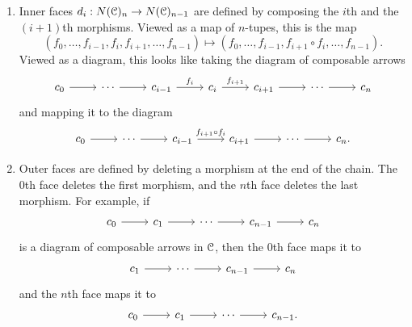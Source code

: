 \begin{definition}
\begin{enumerate}
        \begin{enumerate}
            \item Inner faces $d_i : N(\mathcal{C})_n \to N(\mathcal{C})_{n-1}$ are defined by composing the $i$th and the $(i+1)$th morphisms. Viewed as a map of $n$-tupes, this is the map
        \[
        (f_0,\ldots,f_{i-1},f_i,f_{i+1},\ldots,f_{n-1}) \mapsto (f_0,\ldots,f_{i-1},f_{i+1}\circ f_i,\ldots,f_{n-1}).
        \]
        Viewed as a diagram, this looks like taking the diagram of composable arrows
        \[\begin{tikzcd}
            c_0 \ar[r] & \cdots \ar[r] & c_{i-1} \ar["f_{i}", r] & c_{i} \ar["f_{i+1}",r] & c_{i+1} \ar[r] & \cdots \ar[r] & c_n
        \end{tikzcd}\]
        and mapping it to the diagram
        \[\begin{tikzcd}
            c_0 \ar[r] & \cdots \ar[r] & c_{i-1} \ar["f_{i+1}\circ f_{i}", r] & c_{i+1} \ar[r] & \cdots \ar[r] & c_n.
        \end{tikzcd}\]
        \item Outer faces are defined by deleting a morphism at the end of the chain. The 0th face deletes the first morphism, and the $n$th face deletes the last morphism. For example, if
        \[\begin{tikzcd}
            c_0 \ar[r] & c_1 \ar[r] & \cdots \ar[r] & c_{n-1}\ar[r] & c_n
        \end{tikzcd}\]
        is a diagram of composable arrows in $\mathcal{C}$, then the 0th face maps it to
        \[\begin{tikzcd}
        c_1 \ar[r] & \cdots \ar[r] & c_{n-1}\ar[r] & c_n
        \end{tikzcd}\]
        and the $n$th face maps it to
        \[\begin{tikzcd}
            c_0 \ar[r] & c_1 \ar[r] & \cdots \ar[r] & c_{n-1}.
        \end{tikzcd}\]
        \end{enumerate}
    \end{enumerate}
\end{definition}

